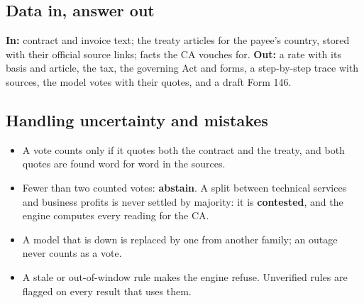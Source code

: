 \documentclass[10pt,a4paper]{article}
\begin{document}
\begin{center}
\end{center}

\begin{minipage}[t]{0.485\linewidth}
\subsection{Data in, answer out}
\textbf{In:} contract and invoice text; the treaty articles for the payee's country, stored with their official source links; facts the CA vouches for. \textbf{Out:} a rate with its basis and article, the tax, the governing Act and forms, a step-by-step trace with sources, the model votes with their quotes, and a draft Form 146.
\subsection{Handling uncertainty and mistakes}
\begin{itemize}
  \item A vote counts only if it quotes both the contract and the treaty, and both quotes are found word for word in the sources.
  \item Fewer than two counted votes: \textbf{abstain}. A split between technical services and business profits is never settled by majority: it is \textbf{contested}, and the engine computes every reading for the CA.
  \item A model that is down is replaced by one from another family; an outage never counts as a vote.
  \item A stale or out-of-window rule makes the engine refuse. Unverified rules are flagged on every result that uses them.
\end{itemize}
\end{minipage}\hfill
\end{document}
